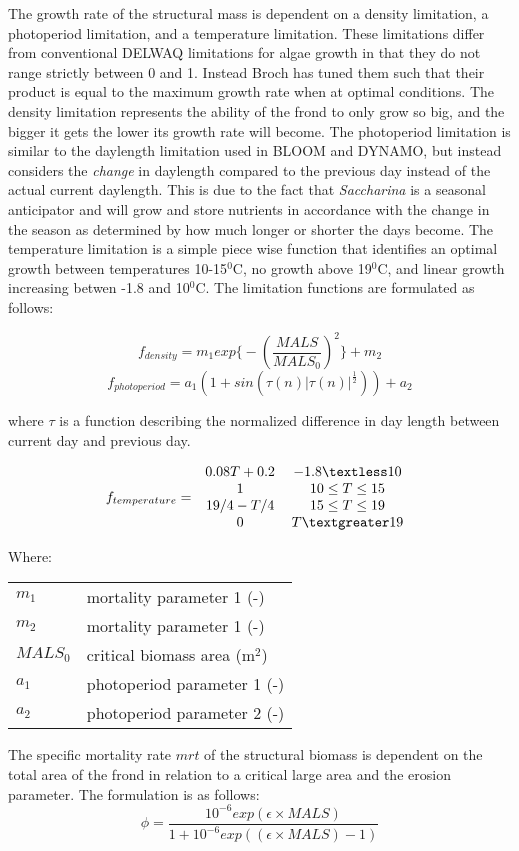 \documentclass{deltares_manual}
\begin{document}
The growth rate of the structural mass is dependent on a density limitation, a photoperiod limitation, and a temperature limitation. These limitations differ from conventional DELWAQ limitations for algae growth in that they do not range strictly between 0 and 1. Instead Broch has tuned them such that their product is equal to the maximum growth rate when at optimal conditions. The density limitation represents the ability of the frond to only grow so big, and the bigger it gets the lower its growth rate will become. The photoperiod limitation is similar to the daylength limitation used in BLOOM and DYNAMO, but instead considers the \textit{change} in daylength compared to the previous day instead of the actual current daylength. This is due to the fact that \textit{Saccharina} is a seasonal anticipator and will grow and store nutrients in accordance with the change in the season as determined by how much longer or shorter the days become. The temperature limitation is a simple piece wise function that identifies an optimal growth between temperatures 10-15$^0$C, no growth above 19$^0$C, and linear growth increasing betwen -1.8 and 10$^0$C.  The limitation functions are formulated as follows:

\[f_{density} = m_1 exp\big\{-(\frac{MALS}{MALS_0})^2 \big\}+m_2\]
\[f_{photoperiod} = a_1 (1+sin(\tau (n) | \tau (n)| ^{\frac{1}{2}})) + a_2\]

where $\tau$ is a function describing the normalized difference in day length between current day and previous day.

\[f_{temperature} =  
\left 
.\begin{tabular}{cc}
$ 0.08T + 0.2 $    & $-1.8 \textless 10$ \\
$  1 $             & $10 \leq T \leq 15$ \\
$19/4 - T/4$       & $15 \leq T \leq 19$ \\ 
$0$                & $T \textgreater 19$ \\
\end{tabular}
\right 
.\]

Where:\\
\begin{tabular}{ll}
$m_1$ & mortality parameter 1 (-)\\
$m_2$ & mortality parameter 1 (-)\\
$MALS_0$ & critical biomass area (m$^2$)\\
$a_1$ & photoperiod parameter 1 (-)\\
$a_2$ & photoperiod parameter 2 (-)\\
\end{tabular}
The specific mortality rate $mrt$ of the structural biomass is dependent on the total area of the frond in relation to a critical large area and the erosion parameter. The formulation is as follows:
\[\phi = \frac{10^{-6}exp(\epsilon\times MALS)}{1+10^{-6}exp((\epsilon\times MALS)-1)}\]
\end{document}
